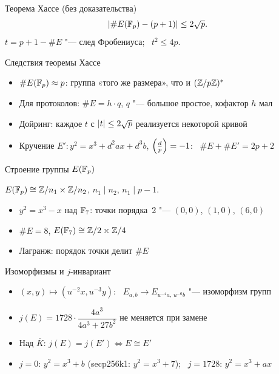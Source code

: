 \documentclass{ca-slides}
\begin{document}
\begin{theoremframe}{Теорема Хассе (без доказательства)}
  \[ \lvert\#E(\mathbb{F}_{p}) - (p + 1)\rvert \le 2\sqrt p. \]
  $t = p + 1 - \#E$ "--- след Фробениуса; \ $t^2 \le 4p$.
\end{theoremframe}

\begin{canvasframe}{Следствия теоремы Хассе}
  \begin{itemize}
    \item $\#E(\mathbb{F}_{p}) \approx p$: группа «того же размера», что и $(\mathbb{Z}/p\mathbb{Z})^{*}$
    \item Для протоколов: $\#E = h \cdot q$, $q$ "--- большое простое, кофактор $h$ мал
    \item Дойринг: каждое $t$ с $\lvert t\rvert \le 2\sqrt p$ реализуется некоторой кривой
    \item Кручение $E'\colon y^2 = x^3 + d^2 a x + d^3 b$, $\left(\frac{d}{p}\right) = -1$:
      \ $\#E + \#E' = 2p + 2$
  \end{itemize}
  \penspace[0.12\textheight]
\end{canvasframe}

\begin{canvasframe}{Строение группы $E(\mathbb{F}_{p})$}
  \begin{theorem}
    $E(\mathbb{F}_{p}) \cong \mathbb{Z}/n_1 \times \mathbb{Z}/n_2$, \quad $n_1 \mid n_2$, \quad $n_1 \mid p - 1$.
  \end{theorem}
  \begin{itemize}
    \item $y^2 = x^3 - x$ над $\mathbb{F}_{7}$: точки порядка~2 "--- $(0, 0)$, $(1, 0)$, $(6, 0)$
    \item $\#E = 8$, \quad $E(\mathbb{F}_{7}) \cong \mathbb{Z}/2 \times \mathbb{Z}/4$
    \item Лагранж: порядок точки делит $\#E$
  \end{itemize}
\end{canvasframe}

\begin{canvasframe}{Изоморфизмы и $j$-инвариант}
  \begin{itemize}
    \item $(x, y) \mapsto (u^{-2}x, u^{-3}y)$: \ $E_{a, b} \to E_{u^{-4}a,\, u^{-6}b}$ "---
      изоморфизм групп
    \item $j(E) = 1728 \cdot \dfrac{4a^3}{4a^3 + 27b^2}$ \quad не меняется при замене
    \item Над $\overline K$: $j(E) = j(E') \iff E \cong E'$
    \item $j = 0$: $y^2 = x^3 + b$ (secp256k1: $y^2 = x^3 + 7$); \ $j = 1728$: $y^2 = x^3 + ax$
  \end{itemize}
  \penspace[0.1\textheight]
\end{canvasframe}
\end{document}
